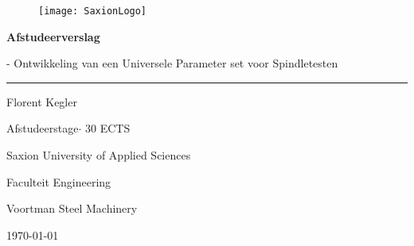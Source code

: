 \newcommand{\thesisAuthor}{Florent Kegler \newline 514277}
\newcommand{\thesisTitle}{Afstudeerverslag}
\newcommand{\thesisSubTitle}{Ontwikkeling van een Universele Parameter set voor Spindletesten}
\newcommand{\thesisDegree}{Afstudeerstage}
\newcommand{\university}{Saxion University of Applied Sciences}
\newcommand{\credits}{30 ECTS}
\newcommand{\faculty}{Faculteit Engineering}
\newcommand{\thesisPlaceDate}{\today}
\newcommand{\company}{Voortman Steel Machinery}

\begin{titlepage}
	
	\thispagestyle{empty}
	\myfont
	
	\begin{figure}
		\vspace{-3cm}
		\centering
		
		\begin{minipage}[t]{.45\linewidth}
			\vspace{1cm}
			\raggedleft
			\hspace*{1cm}\texttt{[image: SaxionLogo]}\hspace*{-5cm}
		\end{minipage}
	\end{figure}
	
	\vspace{3cm}
	\par
	\noindent
	\Huge
	\textbf{\thesisTitle}
	\vspace{0.2cm}
	\small
	\par
	\noindent
	- \thesisSubTitle\\
	\rule[0.3cm]{\linewidth}{2pt}
	\Large
	
	\noindent
	
	\vspace{4cm}
	\noindent
	\LARGE
	\thesisAuthor\\
	\vspace{4 cm}
	\small
	\par \noindent
	\thesisDegree $\cdot$ \credits
	\par \noindent
	\university
	\par \noindent
	\faculty
	\par \noindent
	\company
	\par \noindent
	\thesisPlaceDate
	



	
	
\end{titlepage}